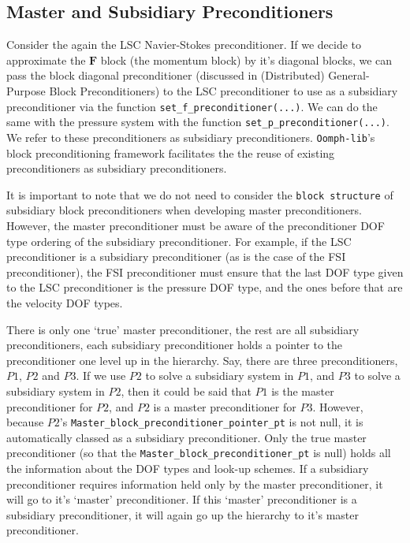 \subsection{Master and Subsidiary Preconditioners\label{sec:master_and_subsidiary_preconditioners}}
Consider the again the LSC Navier-Stokes preconditioner.
If we decide to approximate the $\mathbf{F}$ block (the momentum block) by it's 
diagonal blocks, we can pass the block diagonal preconditioner (discussed in 
(Distributed) General-Purpose Block Preconditioners) to the LSC preconditioner 
to use as a subsidiary preconditioner via the function 
\verb+set_f_preconditioner(...)+. We can do the same with the pressure system 
with the function \verb+set_p_preconditioner(...)+. We refer to these 
preconditioners as subsidiary preconditioners. \verb+Oomph-lib+'s block 
preconditioning framework facilitates the the reuse of existing 
preconditioners as subsidiary preconditioners.

It is important to note that we do not need to consider the 
\verb+block structure+ of subsidiary block preconditioners when developing 
master preconditioners. However, the master preconditioner must be aware of the 
preconditioner DOF type ordering of the subsidiary preconditioner. For example, 
if the LSC preconditioner is a subsidiary preconditioner (as is the case of the 
FSI preconditioner), the FSI preconditioner must ensure that the last DOF type 
given to the LSC preconditioner is the pressure DOF type, and the ones before 
that are the velocity DOF types.

There is only one `true' master preconditioner, the rest are all subsidiary 
preconditioners, each subsidiary preconditioner holds a pointer to the 
preconditioner one level up in the hierarchy. Say, there are three 
preconditioners, $P1$, $P2$ and $P3$. If we use $P2$ to solve a subsidiary 
system in $P1$, and $P3$ to solve a subsidiary system in $P2$, then it could be 
said that $P1$ is the master preconditioner for $P2$, and $P2$ is a master 
preconditioner for $P3$. However, because $P2$'s 
\verb+Master_block_preconditioner_pointer_pt+ is not null, it is automatically 
classed as a subsidiary preconditioner. Only the true master preconditioner (so 
that the \verb+Master_block_preconditioner_pt+ is null) holds all the information
about the DOF types and look-up schemes. If a subsidiary preconditioner requires 
information held only by the master preconditioner, it will go to it's `master'
preconditioner. If this `master' preconditioner is a subsidiary preconditioner, 
it will again go up the hierarchy to it's master preconditioner.

